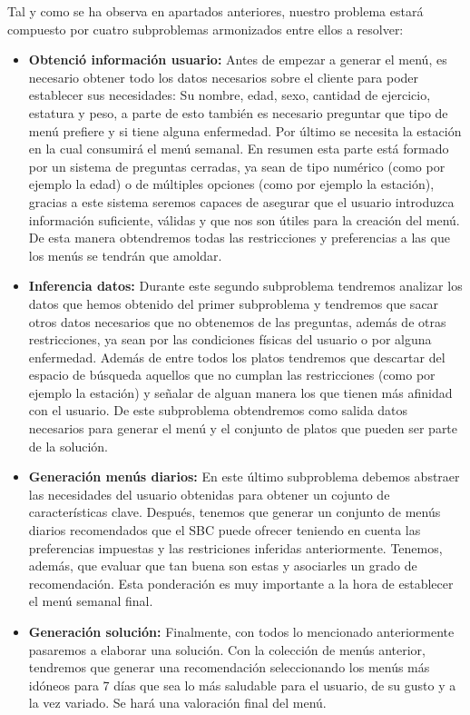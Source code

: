\documentclass[11pt]{article}
\begin{document}
Tal y como se ha observa en apartados anteriores, nuestro problema estará compuesto por cuatro subproblemas armonizados entre ellos a resolver:
\begin{itemize}
    \item \textbf{Obtenció información usuario:} Antes de empezar a generar el menú, es necesario obtener todo los datos necesarios sobre el cliente para poder establecer sus necesidades: Su nombre, edad, sexo, cantidad de ejercicio, estatura y peso, a parte de esto también es necesario preguntar que tipo de menú prefiere y si tiene alguna enfermedad. Por último se necesita la estación en la cual consumirá el menú semanal. En resumen esta parte está formado por un sistema de preguntas cerradas, ya sean de tipo numérico (como por ejemplo la edad) o de múltiples opciones (como por ejemplo la estación), gracias a este sistema seremos capaces de asegurar que el usuario introduzca información suficiente, válidas y que nos son útiles para la creación del menú. De esta manera obtendremos todas las restricciones y preferencias a las que los menús se tendrán que amoldar.
    \item \textbf{Inferencia datos:} Durante este segundo subproblema tendremos analizar los datos que hemos obtenido del primer subproblema y tendremos que sacar otros datos necesarios que no obtenemos de las preguntas, además de otras restricciones, ya sean por las condiciones físicas del usuario o por alguna enfermedad. Además de entre todos los platos tendremos que descartar del espacio de búsqueda aquellos que no cumplan las restricciones (como por ejemplo la estación) y señalar de alguan manera los que tienen más afinidad con el usuario. De este subproblema obtendremos como salida datos necesarios para generar el menú y el conjunto de platos que pueden ser parte de la solución.
    \item \textbf{Generación menús diarios:} En este último subproblema debemos abstraer las necesidades del usuario obtenidas para obtener un cojunto de características clave. Después, tenemos que generar un conjunto de menús diarios recomendados que el SBC puede ofrecer teniendo en cuenta las preferencias impuestas y las restriciones inferidas anteriormente. Tenemos, además, que evaluar que tan buena son estas y asociarles un grado de recomendación. Esta ponderación es muy importante a la hora de establecer el menú semanal final.
    \item \textbf{Generación solución:} Finalmente, con todos lo mencionado anteriormente pasaremos a elaborar una solución. Con la colección de menús anterior, tendremos que generar una recomendación seleccionando los menús más idóneos para 7 días que sea lo más saludable para el usuario, de su gusto y a la vez variado. Se hará una valoración final del menú.
\end{itemize}
\end{document}
